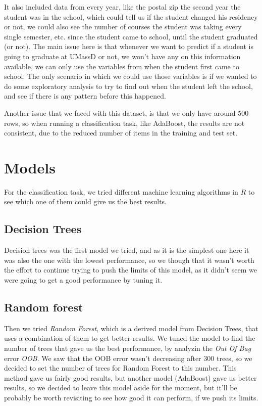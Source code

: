 \documentclass{article}
\begin{document}
It also included data from every year, like the postal zip the second year the student was in the school, which could tell us if the student changed his residency or not, we could also see the number of courses the student was taking every single semester, etc. since the student came to school, until the student graduated (or not). The main issue here is that whenever we want to predict if a student is going to graduate at UMassD or not, we won't have any on this information available, we can only use the variables from when the student first came to school. The only scenario in which we could use those variables is if we wanted to do some exploratory analysis to try to find out when the student left the school, and see if there is any pattern before this happened.

Another issue that we faced with this dataset, is that we only have around 500 rows, so when running a classification task, like AdaBoost, the results are not consistent, due to the reduced number of items in the training and test set.

\section*{Models}

For the classification task, we tried different machine learning algorithms in $R$ to see which one of them could give us the best results.

\subsection*{Decision Trees}

Decision trees was the first model we tried, and as it is the simplest one here it was also the one with the lowest performance, so we though that it wasn't worth the effort to continue trying to push the limits of this model, as it didn't seem we were going to get a good performance by tuning it.
                     
\subsection*{Random forest}

Then we tried \textit{Random Forest}, which is a derived model from Decision Trees, that uses a combination of them to get better results. We tuned the model to find the number of trees that gave us the best performance, by analyzin the \textit{Out Of Bag} error \textit{OOB}. We saw that the OOB error wasn't decreasing after $300$ trees, so we decided to set the number of trees for Random Forest to this number. This method gave us fairly good results, but another model (AdaBoost) gave us better results, so we decided to leave this model aside for the moment, but it'll be probably be worth revisiting to see how good it can perform, if we push its limits.
\end{document}
